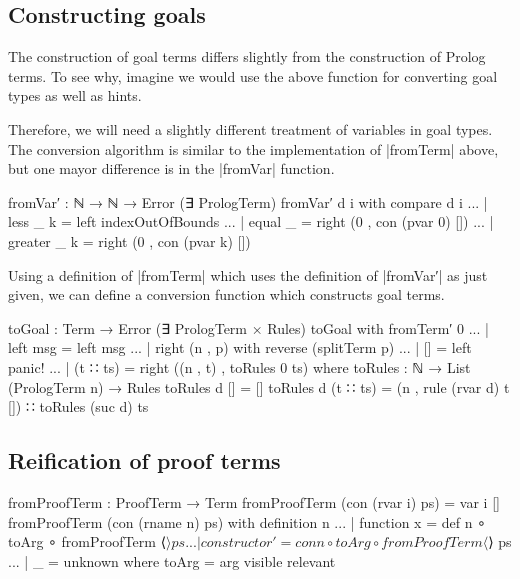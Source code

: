 \documentclass[preprint]{sigplanconf}
\begin{document}


\subsection*{Constructing goals}

The construction of goal terms differs slightly from the construction
of Prolog terms. To see why, imagine we would use the above function
for converting goal types as well as hints.


Therefore, we will need a slightly different treatment of variables in
goal types. The conversion algorithm is similar to the implementation
of |fromTerm| above, but one mayor difference is in the |fromVar|
function.
\begin{code}
fromVar′ : ℕ → ℕ → Error (∃ PrologTerm)
fromVar′  d i with compare d i
... | less    _ k = left indexOutOfBounds
... | equal   _   = right (0 , con (pvar 0) [])
... | greater _ k = right (0 , con (pvar k) [])
\end{code}
Using a definition of |fromTerm| which uses the definition of
|fromVar′| as just given, we can define a conversion function which
constructs goal terms.
\begin{code}
toGoal : Term → Error (∃ PrologTerm × Rules)
toGoal with fromTerm′ 0
... | left msg = left msg
... | right (n , p) with reverse (splitTerm p)
... | []       = left panic!
... | (t ∷ ts) = right ((n , t) , toRules 0 ts)
  where
    toRules : ℕ → List (PrologTerm n) → Rules
    toRules d [] = []
    toRules d (t ∷ ts) = (n , rule (rvar d) t []) ∷ toRules (suc d) ts
\end{code}



\subsection*{Reification of proof terms}

\begin{code}
fromProofTerm : ProofTerm → Term
fromProofTerm (con (rvar i) ps) = var i []
fromProofTerm (con (rname n) ps) with definition n
... | function x    = def n ∘ toArg ∘ fromProofTerm ⟨$⟩ ps
... | constructor′  = con n ∘ toArg ∘ fromProofTerm ⟨$⟩ ps
... | _             = unknown
  where
   toArg = arg visible relevant
\end{code}
\end{document}
